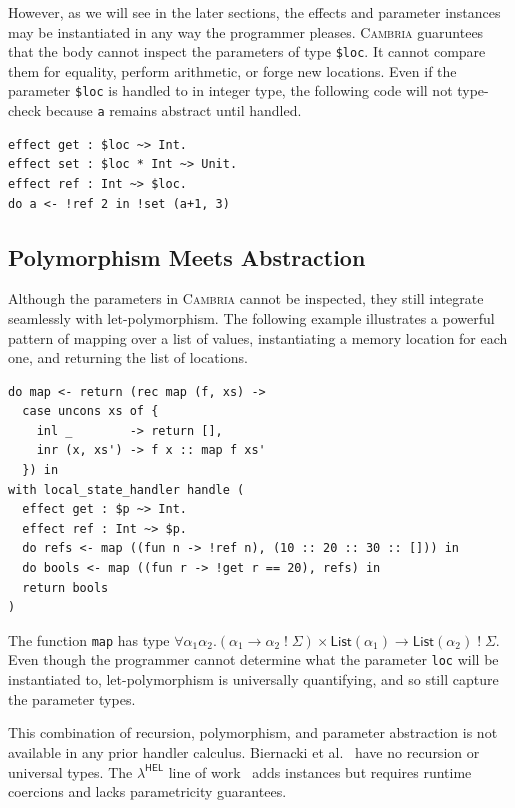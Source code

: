 \documentclass[acmsmall,screen,review,anonymous]{acmart}
\newcommand{\cambria}{\textsc{Cambria}}
\newcommand{\tlist}[1]{\mathsf{List}(#1)}
\newcommand{\comp}[2]{#1\;!\;#2}
\newcommand{\Sig}{\Sigma}
\begin{document}
However, as we will see in the later sections, the effects and parameter instances may be instantiated in any way the programmer pleases.
\cambria{} guaruntees that the body cannot inspect the parameters of type \lstinline|$loc|.
It cannot compare them for equality, perform arithmetic, or forge new locations.
Even if the parameter \lstinline|$loc| is handled to in integer type,
the following code will not type-check because \lstinline|a| remains abstract until handled.

\begin{lstlisting}
effect get : $loc ~> Int.
effect set : $loc * Int ~> Unit.
effect ref : Int ~> $loc.
do a <- !ref 2 in !set (a+1, 3)
\end{lstlisting}

\subsection{Polymorphism Meets Abstraction}\label{sec:poly-refs}

Although the parameters in \cambria{} cannot be inspected, they still integrate seamlessly with let-polymorphism.
The following example illustrates a powerful pattern of mapping over a list of values, instantiating a memory location for each one,
and returning the list of locations.

\begin{lstlisting}
do map <- return (rec map (f, xs) ->
  case uncons xs of {
    inl _        -> return [],
    inr (x, xs') -> f x :: map f xs'
  }) in
with local_state_handler handle (
  effect get : $p ~> Int.
  effect ref : Int ~> $p.
  do refs <- map ((fun n -> !ref n), (10 :: 20 :: 30 :: [])) in
  do bools <- map ((fun r -> !get r == 20), refs) in
  return bools
)
\end{lstlisting}

The function \lstinline{map} has type $\forall\alpha_1\alpha_2.(\alpha_1 \to \comp{\alpha_2}{\Sig}) \times \tlist{\alpha_1} \to \comp{\tlist{\alpha_2}}{\Sig}$.
Even though the programmer cannot determine what the parameter \lstinline|loc| will be instantiated to, let-polymorphism is universally quantifying, and so
still capture the parameter types.

This combination of recursion, polymorphism, and parameter abstraction is not available in any prior handler calculus.
Biernacki et al.~\cite{biernacki2018handle} have no recursion or universal types.
The $\lambda^{\mathsf{HEL}}$ line of work~\cite{} adds instances but requires runtime coercions and lacks parametricity guarantees.
\end{document}
